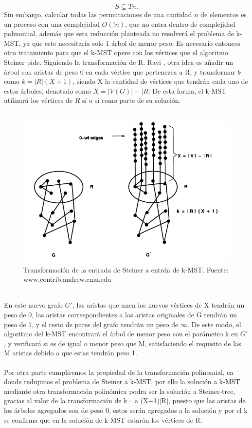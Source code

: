 \documentclass[spanish,12pt]{elsarticle}
\begin{document}
\[
S \subseteq Tn.
\]
Sin embargo, calcular todas las permutaciones de una cantidad $n$ de elementos es un proceso con una complejidad $O(!n)$, que no entra dentro de complejidad polinomial, además que esta reducción planteada no resolverá el problema de k-MST, ya que este necesitaría solo 1 árbol de menor peso. Es necesario entonces otro tratamiento para que el k-MST opere con los vértices que el algoritmo Steiner pide. Siguiendo la transformación de R. Ravi \cite{3}, otra idea es añadir un árbol con aristas de peso 0 en cada vértice que pertenezca a R, y transformar $k$ como $k = |R|(X+1)$, siendo X la cantidad de vértices que tendrán cada uno de estos árboles, denotado como $X = |V(G)|-|R|$ De esta forma, el k-MST utilizará los vértices de $R$ sí o sí como parte de su solución.
\\\\ 
\begin{figure}[h]
    \centering
    \includegraphics[scale=0.65]{images/graph_explicacion.png}
    \caption{Transformación de la entrada de Steiner a entrda de k-MST. Fuente: www.contrib.andrew.cmu.edu }
    \label{fig:my_label}
\end{figure}
\\
En este nuevo grafo $G'$, las aristas que unen los nuevos vértices de X tendrán un peso de 0, las aristas correspondientes a las aristas originales de G tendrán un peso de 1, y el resto de pares del grafo tendrán un peso de $\infty$. De este modo, el algoritmo del k-MST encontrará el árbol de menor peso con el parámetro k en $G'$, y verificará si es de igual o menor peso que M, satisfaciendo el requisito de las M aristas debido a que estas tendrán peso 1.\\\\
Por otra parte cumpliremos la propiedad de la transformación polinomial, en donde redujimos el problema de Steiner a k-MST, por ello la solución a k-MST mediante otra transformación polinómica podra ser la solución a Steiner-tree, gracias al valor de la transformación de k= a (X+1)|R|, puesto que las aristas de los árboles agregados son de peso 0, estos serán agregados a la solución y por el k se confirma que en la solución de k-MST estarán los vértices de R.
\end{document}
